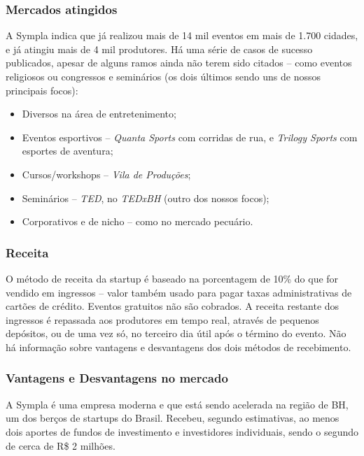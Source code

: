 \documentclass[12pt,a4paper,twoside,hyphens,english,brazil]{abntex2}
\begin{document}
\subsubsection*{Mercados atingidos}
A Sympla indica que já realizou mais de 14 mil eventos em mais de 1.700 cidades, e já atingiu mais de 4 mil produtores. Há uma série de casos de sucesso publicados\cite{sympla-cases}, apesar de alguns ramos ainda não terem sido citados -- como eventos religiosos ou congressos e seminários (os dois últimos sendo uns de nossos principais focos):
\begin{itemize}[itemsep=-1ex]
	\item Diversos na área de entretenimento;
	\item Eventos esportivos -- \emph{Quanta Sports} com corridas de rua, e \emph{Trilogy Sports} com esportes de aventura;
	\item Cursos/workshops -- \emph{Vila de Produções};
	\item Seminários -- \emph{TED}\footnotemark, no \emph{TEDxBH} (outro dos nossos focos);
	\item Corporativos e de nicho -- como no mercado pecuário.
\end{itemize}

\subsubsection*{Receita}
O método de receita da startup é baseado na porcentagem de 10\% do que for vendido em ingressos -- valor também usado para pagar taxas administrativas de cartões de crédito. Eventos gratuitos não são cobrados. A receita restante dos ingressos é repassada aos produtores em tempo real, através de pequenos depósitos, ou de uma vez só, no terceiro dia útil após o término do evento. Não há informação sobre vantagens e desvantagens dos dois métodos de recebimento.

\subsubsection*{Vantagens e Desvantagens no mercado}
A Sympla é uma empresa moderna e que está sendo acelerada na região de BH, um dos berços de startups do Brasil. Recebeu, segundo estimativas, ao menos dois aportes de fundos de investimento e investidores individuais, sendo o segundo de cerca de R\$ 2 milhões.\cite{sympla-aporte}
\end{document}
